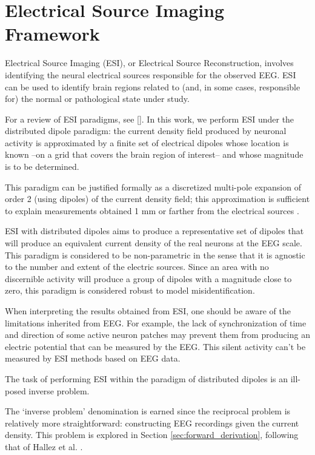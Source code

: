 \section{Electrical Source Imaging Framework}

Electrical Source Imaging (ESI), or Electrical Source Reconstruction, involves identifying the neural electrical sources responsible for the observed EEG.
%
ESI can be used to identify brain regions related to (and, in some cases, responsible for) the normal or pathological state under study.

For a review of ESI paradigms, see []. 
%
In this work, we perform ESI under the distributed dipole paradigm: the current density field produced by neuronal activity is approximated by a finite set of electrical dipoles whose location is known --on a grid that covers the brain region of interest-- and whose magnitude is to be determined. 

This paradigm can be justified formally as a discretized multi-pole expansion of order 2 (using dipoles) of the current density field; this approximation is sufficient to explain measurements obtained 1 mm or farther from the electrical sources \cite{nunez2019multi}.

ESI with distributed dipoles aims to produce a representative set of dipoles that will produce an equivalent current density of the real neurons at the EEG scale.
%
This paradigm is considered to be non-parametric in the sense that it is agnostic to the number and extent of the electric sources. 
%
Since an area with no discernible activity will produce a group of dipoles with a magnitude close to zero, this paradigm is considered robust to model misidentification.

When interpreting the results obtained from ESI, one should be aware of the limitations inherited from EEG.
%
For example, the lack of synchronization of time and direction of some active neuron patches may prevent them from producing an electric potential that can be measured by the EEG.
%
This silent activity can't be measured by ESI methods based on EEG data.

The task of performing ESI within the paradigm of distributed dipoles is an ill-posed inverse problem.

The `inverse problem' denomination is earned since the reciprocal problem is relatively more straightforward: constructing EEG recordings given the current density.
%
This problem is explored in Section \ref{sec:forward_derivation}, following that of Hallez et al. \cite{hallez2007review}.

